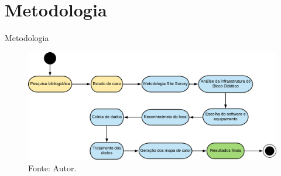 \documentclass[aspectratio=169,12pt]{beamer}
\begin{document}
\section{Metodologia}
\begin{frame}{Metodologia}
	\vspace*{-.1cm}
	\begin{figure}[H]
		\centering
		\includegraphics[scale=.32]{fig_tcc/slide_metodologia.pdf}
		\caption*{{\footnotesize Fonte: Autor.}}
	\end{figure}
\end{frame}
\end{document}
